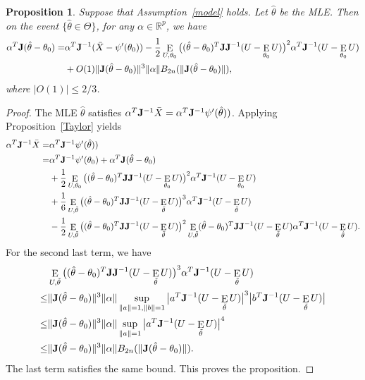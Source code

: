 \documentclass[11pt, letterpaper]{article}
\DeclareMathOperator{\myE}{E}
\theoremstyle{plain}
\newtheorem{proposition}{\quad\quad Proposition}
\theoremstyle{definition}
\theoremstyle{remark}
\begin{document}
\begin{proposition}\label{MLEexpansion}
    Suppose that Assumption~\ref{model} holds. Let $\hat{\theta}$ be the MLE.
    Then on the event  $\{\hat{\theta}\in \Theta\}$, for any $\alpha\in \mathbb{R}^p$, we have
    $$
    \begin{aligned}
        \alpha^T \BJ (\hat{\theta}-\theta_0)=&\alpha^T \BJ^{-1}(\bar{X}-\psi'(\theta_0))-\frac{1}{2}\myE_{U,\theta_0}\big((\hat{\theta}-\theta_0)^T \BJ \BJ^{-1}(U-\myE_{\theta_0}U)\big)^2 \alpha^T \BJ^{-1}(U-\myE_{\theta_0}U)\\
        &+O(1)\|\BJ (\hat{\theta}-\theta_0)\|^3 \|\alpha\| B_{2n}(\|\BJ (\hat{\theta}-\theta_0)\|),
    \end{aligned}
    $$
    where $|O(1)|\leq 2/3$.
\end{proposition}
\begin{proof}
    The MLE $\hat{\theta}$ satisfies $\alpha^T \mathbf{J}^{-1}\bar{X}=\alpha^T \mathbf{J}^{-1}\psi'(\hat{\theta}))$. Applying Proposition~\ref{Taylor} yields
    $$
    \begin{aligned}
        \alpha^T \BJ^{-1}\bar{X}=&\alpha^T \BJ^{-1}\psi'(\hat{\theta}))\\
        =&\alpha^T \BJ^{-1}\psi'(\theta_0)+\alpha^T \BJ (\hat{\theta}-\theta_0)\\
        &+\frac{1}{2}\myE_{U,\theta_0}\big((\hat{\theta}-\theta_0)^T \BJ \BJ^{-1}(U-\myE_{\theta_0}U)\big)^2 \alpha^T \BJ^{-1}(U-\myE_{\theta_0}U)\\
        &+\frac{1}{6}\myE_{U,\tilde{\theta}}\big((\hat{\theta}-\theta_0)^T \BJ \BJ^{-1} (U-\myE_{\tilde{\theta}}U) \big)^3 \alpha^T \BJ^{-1}(U-\myE_{\tilde{\theta}}U)\\
        &-\frac{1}{2}\myE_{U,\tilde{\theta}}\big((\hat{\theta}-\theta_0)^T \BJ \BJ^{-1}(U-\myE_{\tilde{\theta}}U)\big)^2 \myE_{U,\tilde{\theta}}(\hat{\theta}-\theta_0)^T \BJ \BJ^{-1}(U-\myE_{\tilde{\theta}}U) \alpha^T \BJ^{-1}(U-\myE_{\hat{\theta}}U).
    \end{aligned}
    $$
    For the second last term, we have
    $$
    \begin{aligned}
        &\myE_{U,\tilde{\theta}}\big((\hat{\theta}-\theta_0)^T \BJ \BJ^{-1} (U-\myE_{\tilde{\theta}}U) \big)^3 \alpha^T \BJ^{-1}(U-\myE_{\tilde{\theta}}U)\\
        \leq & \|\BJ (\hat{\theta}-\theta_0)\|^3 \|\alpha\|\sup_{\|a\|=1,\|b\|=1}\big|a^T \BJ^{-1}(U-\myE_{\tilde{\theta}} U)\big|^3 \big| b^T \BJ^{-1}(U-\myE_{\tilde{\theta}}U)\big|\\
        \leq & \|\BJ (\hat{\theta}-\theta_0)\|^3 \|\alpha\|\sup_{\|a\|=1}\big|a^T \BJ^{-1}(U-\myE_{\tilde{\theta}} U)\big|^4\\
        \leq & \|\BJ (\hat{\theta}-\theta_0)\|^3 \|\alpha\| B_{2n}(\|\BJ (\hat{\theta}-\theta_0)\|).
    \end{aligned}
    $$
    The last term satisfies the same bound. This proves the proposition.


\end{proof}
\end{document}
